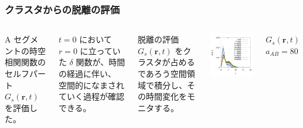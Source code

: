 \documentclass[12pt, dvipdfmx]{beamer}
\begin{document}
\begin{frame}

\frametitle{クラスタからの脱離の評価}

\begin{columns}[T, totalwidth=\linewidth]
A セグメントの時空相関関数のセルフパート $G_s(\bm{r}, t)$ を評価した。

$t=0$ において $r=0$ に立っていた $\delta$ 関数が、時間の経過に伴い、{\color{red} 空間的になまされていく過程}が確認できる。

\begin{exampleblock}{脱離の評価}
$G_s(\bm{r}, t)$ をクラスタが占めるであろう空間領域で積分し、その時間変化をモニタする。
\end{exampleblock}


	\includegraphics[width=\columnwidth]{./fig/AB80/Ave_Trj.pdf}

\centering
	$G_s(\bm{r}, t)$\\$a_{AB} = 80$
\end{columns}

\end{frame}
\end{document}
